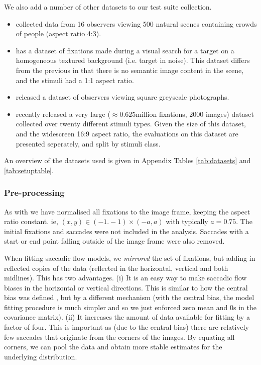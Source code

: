 We also add a number of other datasets to our test suite collection. 
\begin{itemize}

\item \cite{jiang2014} collected data from 16 observers viewing 500 natural scenes containing crowds of people (aspect ratio 4:3).

\item \cite{clarke2009} has a dataset of fixations made during a visual search for a target on a homogeneous textured background (i.e. target in noise). This dataset differs from the previous in that there is no semantic image content in the scene, and the stimuli had a 1:1 aspect ratio.

\item \cite{greene-wolfe2012} released a dataset of observers viewing square greyscale photographs.

\item \cite{borji2015} recently released a very large ($\approx 0.625$million fixations, 2000 images) dataset collected over twenty different stimuli types. Given the size of this dataset, and the widescreen 16:9 aspect ratio, the evaluations on this dataset are presented seperately, and split by stimuli class.

\end{itemize}

An overview of the datasets used is given in Appendix Tables \ref{tab:datasets} and \ref{tab:setuptable}.

\subsubsection{Pre-processing}

As with \cite{clarke-tatler2014} we have normalised all fixations to the image frame, keeping the aspect ratio constant. ie, $(x,y)\in (-1.-1)\times(-a,a)$ with typically $a=0.75$. The initial fixations and saccades were not included in the analysis. Saccades with a start or end point falling outside of the image frame were also removed. 

When fitting saccadic flow models,  we \textit{mirrored} the set of fixations, but adding in reflected copies of the data (reflected in the horizontal, vertical and both midlines). This has two advantages. (i) It is an easy way to make saccadic flow biases in the horizontal or vertical directions. This is similar to how the central bias was defined \cite{clarke-tatler2014}, but by a different mechanism (with the central bias, the model fitting procedure is much simpler and so we just enforced zero mean and 0s in the covariance matrix). (ii) It increases the amount of data available for fitting by a factor of four. This is important as (due to the central bias) there are relatively few saccades that originate from the corners of the images. By equating all corners, we can pool the data and obtain more stable estimates for the underlying distribution. 


